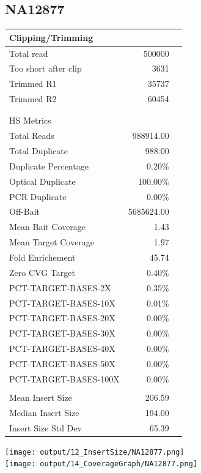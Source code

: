 \documentclass[10pt,twoside,english]{scrartcl}
\begin{document}
 \begin{landscape} 
\subsection{NA12877} 
\begin{minipage}[c][6in]{9.3in} 
\centering 
\begin{minipage}[c][6in]{4in}
\centering
\begin{tabular}{lrl}
\multicolumn{3}{l}{Clipping/Trimming} \\ 

\hline 
Total read              & 500000 \\ 
Too short after clip    & 3631  \\ 
Trimmed R1              & 35737 \\ 
Trimmed R2              & 60454  \\ 
\hline 
\\\\ 
\multicolumn{3}{l}{HS Metrics} \\ 
\hline 
Total Reads             & 988914.00  \\ 
Total Duplicate         & 988.00  \\ 
Duplicate Percentage    & 0.20\%   \\ 
Optical Duplicate       & 100.00\%   \\ 
PCR Duplicate           & 0.00\%   \\ 
Off-Bait                & 5685624.00   \\ 
Mean Bait Coverage      & 1.43   \\ 
Mean Target Coverage    & 1.97   \\ 
Fold Enrichement        & 45.74   \\ 
Zero CVG Target         & 0.40\%  \\ 
PCT-TARGET-BASES-2X     & 0.35\%   \\ 
PCT-TARGET-BASES-10X    & 0.01\%   \\ 
PCT-TARGET-BASES-20X    & 0.00\%   \\ 
PCT-TARGET-BASES-30X    & 0.00\%   \\ 
PCT-TARGET-BASES-40X    & 0.00\%   \\ 
PCT-TARGET-BASES-50X    & 0.00\%   \\ 
PCT-TARGET-BASES-100X   & 0.00\%   \\ 
\hline 
\\ 
\hline 
Mean Insert Size        & 206.59 \\ 
Median Insert Size      & 194.00 \\ 
Insert Size Std Dev     & 65.39 \\ 
\hline 
\end{tabular}
\end{minipage}%
\begin{minipage}[c][6in]{5in}
\centering 
\texttt{[image: output/12\_InsertSize/NA12877.png]}\\ 
\vfill 
\texttt{[image: output/14\_CoverageGraph/NA12877.png]} 
\end{minipage} 
\end{minipage} 
\end{landscape} 
\end{document}
